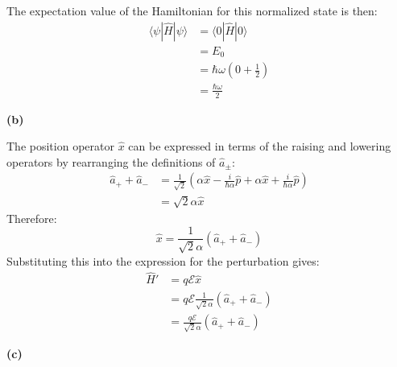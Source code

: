 \documentclass{article}
\begin{document}
The expectation value of the Hamiltonian for this normalized state is then:
\begin{align*}
\langle \psi | \hat{H} | \psi \rangle &= \langle 0 | \hat{H} | 0 \rangle \\
&= E_0 \\
&= \hbar \omega (0 + \frac{1}{2}) \\
&= \frac{\hbar \omega}{2}
\end{align*}

\textbf{(b)}

The position operator $\hat{x}$ can be expressed in terms of the raising and lowering operators by rearranging the definitions of $\hat{a}_\pm$:
\begin{align*}
\hat{a}_+ + \hat{a}_- &= \frac{1}{\sqrt{2}} \left( \alpha \hat{x} - \frac{i}{\hbar \alpha} \hat{p} + \alpha \hat{x} + \frac{i}{\hbar \alpha} \hat{p} \right) \\
&= \sqrt{2} \alpha \hat{x}
\end{align*}
Therefore:
\begin{equation*}
\hat{x} = \frac{1}{\sqrt{2} \alpha} (\hat{a}_+ + \hat{a}_-)
\end{equation*}
Substituting this into the expression for the perturbation gives:
\begin{align*}
\hat{H}' &= q \mathcal{E} \hat{x} \\
&= q \mathcal{E} \frac{1}{\sqrt{2} \alpha} (\hat{a}_+ + \hat{a}_-) \\
&= \frac{q \mathcal{E}}{\sqrt{2} \alpha} (\hat{a}_+ + \hat{a}_-)
\end{align*}

\textbf{(c)}
\end{document}
